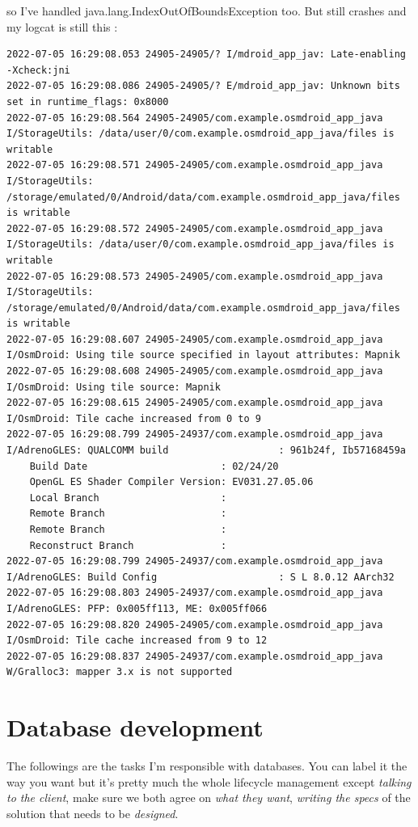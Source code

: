 \documentclass[a4paper,12pt]{book}
\begin{document}
so I've handled java.lang.IndexOutOfBoundsException too. But still crashes and my logcat is still this :

\begin{lstlisting}
2022-07-05 16:29:08.053 24905-24905/? I/mdroid_app_jav: Late-enabling -Xcheck:jni
2022-07-05 16:29:08.086 24905-24905/? E/mdroid_app_jav: Unknown bits set in runtime_flags: 0x8000
2022-07-05 16:29:08.564 24905-24905/com.example.osmdroid_app_java I/StorageUtils: /data/user/0/com.example.osmdroid_app_java/files is writable
2022-07-05 16:29:08.571 24905-24905/com.example.osmdroid_app_java I/StorageUtils: /storage/emulated/0/Android/data/com.example.osmdroid_app_java/files is writable
2022-07-05 16:29:08.572 24905-24905/com.example.osmdroid_app_java I/StorageUtils: /data/user/0/com.example.osmdroid_app_java/files is writable
2022-07-05 16:29:08.573 24905-24905/com.example.osmdroid_app_java I/StorageUtils: /storage/emulated/0/Android/data/com.example.osmdroid_app_java/files is writable
2022-07-05 16:29:08.607 24905-24905/com.example.osmdroid_app_java I/OsmDroid: Using tile source specified in layout attributes: Mapnik
2022-07-05 16:29:08.608 24905-24905/com.example.osmdroid_app_java I/OsmDroid: Using tile source: Mapnik
2022-07-05 16:29:08.615 24905-24905/com.example.osmdroid_app_java I/OsmDroid: Tile cache increased from 0 to 9
2022-07-05 16:29:08.799 24905-24937/com.example.osmdroid_app_java I/AdrenoGLES: QUALCOMM build                   : 961b24f, Ib57168459a
    Build Date                       : 02/24/20
    OpenGL ES Shader Compiler Version: EV031.27.05.06
    Local Branch                     : 
    Remote Branch                    : 
    Remote Branch                    : 
    Reconstruct Branch               : 
2022-07-05 16:29:08.799 24905-24937/com.example.osmdroid_app_java I/AdrenoGLES: Build Config                     : S L 8.0.12 AArch32
2022-07-05 16:29:08.803 24905-24937/com.example.osmdroid_app_java I/AdrenoGLES: PFP: 0x005ff113, ME: 0x005ff066
2022-07-05 16:29:08.820 24905-24905/com.example.osmdroid_app_java I/OsmDroid: Tile cache increased from 9 to 12
2022-07-05 16:29:08.837 24905-24937/com.example.osmdroid_app_java W/Gralloc3: mapper 3.x is not supported
\end{lstlisting}

\part{Database development}

The followings are the tasks I'm responsible with databases. You can label it the way you want but it's pretty much the whole lifecycle management except \emph{talking to the client}, make sure we both agree on \emph{what they want}, \emph{writing the specs} of the solution that needs to be \emph{designed}.
\end{document}
